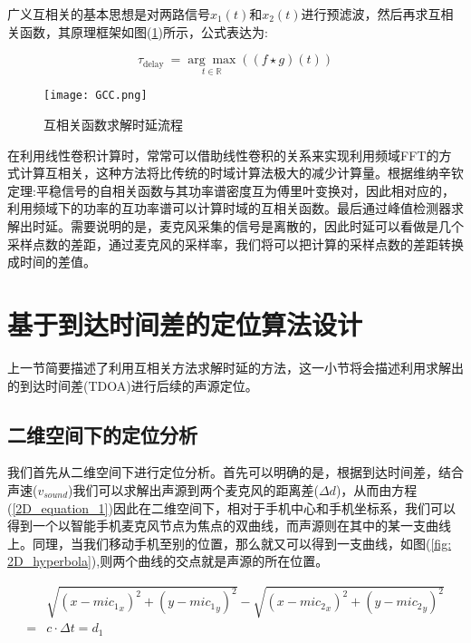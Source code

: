\documentclass[winfonts]{njuthesis}
\begin{document}
		广义互相关的基本思想是对两路信号$x_1(t)$和$x_2(t)$进行预滤波，然后再求互相关函数，其原理框架如图(\ref{fig: GCC})所示，公式表达为:
		
		\begin{equation}
		\tau_{\text {delay }}=\underset{t \in \mathbb{R}}{\arg \max }((f \star g)(t))
		\end{equation}
		
		\begin{figure}[H]
			\centering
			\texttt{[image: GCC.png]} 
			\caption{互相关函数求解时延流程}
			\label{fig: GCC}
		\end{figure}	
		
		在利用线性卷积计算时，常常可以借助线性卷积的关系来实现利用频域FFT的方式计算互相关，这种方法将比传统的时域计算法极大的减少计算量。根据维纳辛钦定理:平稳信号的自相关函数与其功率谱密度互为傅里叶变换对，因此相对应的，利用频域下的功率的互功率谱可以计算时域的互相关函数。最后通过峰值检测器求解出时延。需要说明的是，麦克风采集的信号是离散的，因此时延可以看做是几个采样点数的差距，通过麦克风的采样率，我们将可以把计算的采样点数的差距转换成时间的差值。
	
	\section{基于到达时间差的定位算法设计}
	
		上一节简要描述了利用互相关方法求解时延的方法，这一小节将会描述利用求解出的到达时间差(TDOA)进行后续的声源定位。
		
		\subsection{二维空间下的定位分析}
		
		我们首先从二维空间下进行定位分析。首先可以明确的是，根据到达时间差，结合声速($v_{sound}$)我们可以求解出声源到两个麦克风的距离差($\Delta d$)，从而由方程(\ref{2D_equation_1})因此在二维空间下，相对于手机中心和手机坐标系，我们可以得到一个以智能手机麦克风节点为焦点的双曲线，而声源则在其中的某一支曲线上。同理，当我们移动手机至别的位置，那么就又可以得到一支曲线，如图(\ref{fig: 2D_hyperbola}),则两个曲线的交点就是声源的所在位置。
		
		\begin{equation}
		\begin{aligned}
			&\sqrt{(x-{mic_1}_x)^2+(y-{mic_1}_y)^2} - \sqrt{(x-{mic_2}_x)^2+(y-{mic_2}_y)^2}\\
		  = & c \cdot \Delta t= d_1 \label{2D_equation_1}
		\end{aligned}
		\end{equation}
		
\end{document}
